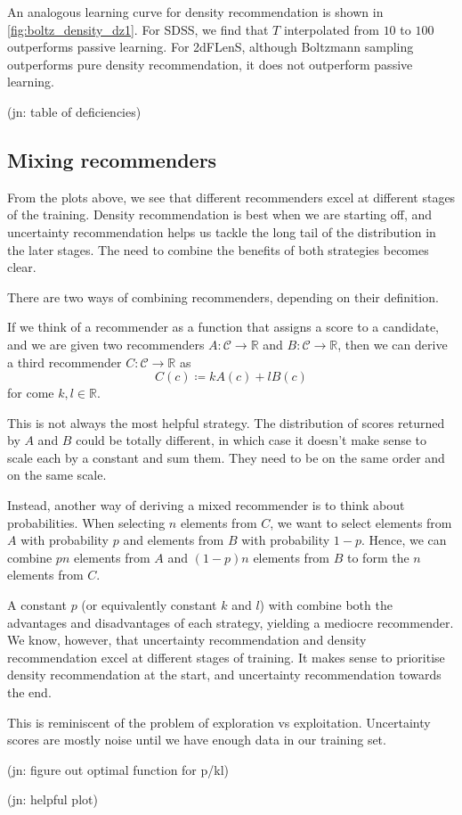 \documentclass[11pt,twoside,openright]{report}
\newcommand\bbR{\mathbb{R}}
\newcommand\cC{\mathcal{C}}
\newcommand\jn[1]{{\color{red}(jn: #1)}}
\begin{document}
An analogous learning curve for density recommendation is shown in \cref{fig:boltz_density_dz1}. For SDSS, we find that $T$ interpolated from $10$ to $100$ outperforms passive learning. For 2dFLenS, although Boltzmann sampling outperforms pure density recommendation, it does not outperform passive learning.

\jn{table of deficiencies}

\subsection{Mixing recommenders}

From the plots above, we see that different recommenders excel at different stages of the training. Density recommendation is best when we are starting off, and uncertainty recommendation helps us tackle the long tail of the distribution in the later stages. The need to combine the benefits of both strategies becomes clear.

There are two ways of combining recommenders, depending on their definition.

If we think of a recommender as a function that assigns a score to a candidate, and we are given two recommenders $A : \cC \to \bbR$ and $B : \cC \to \bbR$, then we can derive a third recommender $C : \cC \to \bbR$ as \[
    C(c) \coloneqq kA(c) + lB(c)
\] for come $k, l \in \bbR$.

This is not always the most helpful strategy. The distribution of scores returned by $A$ and $B$ could be totally different, in which case it doesn't make sense to scale each by a constant and sum them. They need to be on the same order and on the same scale.

Instead, another way of deriving a mixed recommender is to think about probabilities. When selecting $n$ elements from $C$, we want to select elements from $A$ with probability $p$ and elements from $B$ with probability $1-p$. Hence, we can combine $pn$ elements from $A$ and $(1-p)n$ elements from $B$ to form the $n$ elements from $C$.

A constant $p$ (or equivalently constant $k$ and $l$) with combine both the advantages and disadvantages of each strategy, yielding a mediocre recommender. We know, however, that uncertainty recommendation and density recommendation excel at different stages of training. It makes sense to prioritise density recommendation at the start, and uncertainty recommendation towards the end.

This is reminiscent of the problem of exploration vs exploitation. Uncertainty scores are mostly noise until we have enough data in our training set.

\jn{figure out optimal function for p/kl}

\jn{helpful plot}

{}

\end{document}
